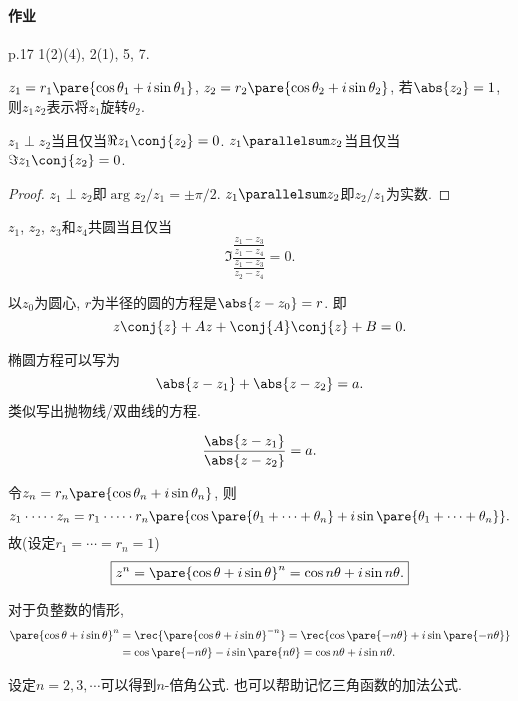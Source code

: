 \documentclass[../ComplexVariable.tex]{subfiles}
\begin{document}
\paragraph{作业} %
\label{par:作业}

p.17 1(2)(4), 2(1), 5, 7.


\begin{sample}
    \begin{ex}
        $z_1 = r_1\pare{\cos\theta_1 + i\sin\theta_1}$, $z_2 = r_2\pare{\cos\theta_2+i\sin\theta_2}$, 若$\abs{z_2}=1$, 则$z_1z_2$表示将$z_1$旋转$\theta_2$.
    \end{ex}
    \begin{ex}
        $z_1\perp z_2$当且仅当$\Re z_1\conj{z_2} = 0$. $z_1\parallelsum z_2$当且仅当$\Im z_1\conj{z_2} = 0$.
    \end{ex}
    \begin{proof}
        $z_1\perp z_2$即$\arg z_2/z_1 = \pm \pi/2$. $z_1\parallelsum z_2$即$z_2/z_1$为实数.
    \end{proof}
    \begin{ex}
        $z_1$, $z_2$, $z_3$和$z_4$共圆当且仅当
        \[ \Im \frac{\frac{z_1-z_3}{z_1-z_4}}{\frac{z_1-z_3}{z_2-z_4}} = 0. \]
    \end{ex}
    \begin{ex}
        以$z_0$为圆心, $r$为半径的圆的方程是$\abs{z-z_0} = r$. 即\inlinehardlink{\eqref{eq:复数平方和展开}}
        \[ z\conj{z} + Az + \conj{A}\conj{z} + B = 0. \]
    \end{ex}
    \begin{ex}
        椭圆方程可以写为
        \[ \abs{z-z_1} + \abs{z-z_2} = a. \]
        类似写出抛物线/双曲线的方程.
    \end{ex}
    \begin{ex}[Apollonius圆]
        \[ \frac{\abs{z-z_1}}{\abs{z-z_2}} = a. \]
    \end{ex}
\end{sample}
\begin{theorem}[De Moivre公式]
    令$z_n = r_n\pare{\cos\theta_n + i\sin \theta_n}$, 则
    \[ z_1\cdot \cdots \cdot z_n = r_1\cdot\cdots\cdot r_n\pare{\cos\pare{\theta_1+\cdots + \theta_n} + i\sin\pare{\theta_1 + \cdots + \theta_n}}. \]
    故(设定$r_1 = \cdots = r_n = 1$)
    \[ \boxed{z^n = \pare{\cos\theta + i\sin\theta}^n = \cos n\theta + i\sin n\theta.} \]
\end{theorem}
\begin{remark}
    对于负整数的情形,
    \begin{align*}
        \pare{\cos\theta+i\sin\theta}^n & = \rec{\pare{\cos\theta + i\sin\theta}^{-n}} = \rec{\cos\pare{-n\theta} + i\sin\pare{-n\theta}} \\
        & = \cos\pare{-n\theta} - i\sin \pare{n\theta} = \cos n\theta + i\sin n\theta. 
    \end{align*}
\end{remark}
\begin{remark}
    设定$n=2,3,\cdots$可以得到$n$-倍角公式. 也可以帮助记忆三角函数的加法公式.
\end{remark}
\end{document}
